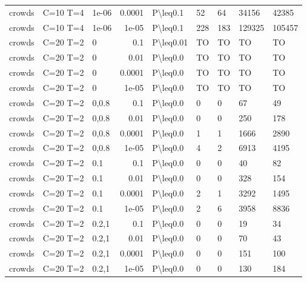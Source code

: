 \begin{longtable}{lllrlllll}
 crowds        & C=10 T=4  & 1e-06 & 0.0001 & P\textbackslash{}leq0.1   & 52   & 64   & 34156    & 42385   \\
 crowds        & C=10 T=4  & 1e-06 & 1e-05  & P\textbackslash{}leq0.1   & 228  & 183  & 129325   & 105457  \\
 crowds        & C=20 T=2  & 0     & 0.1    & P\textbackslash{}leq0.01  & TO   & TO   & TO       & TO      \\
 crowds        & C=20 T=2  & 0     & 0.01   & P\textbackslash{}leq0.0   & TO   & TO   & TO       & TO      \\
 crowds        & C=20 T=2  & 0     & 0.0001 & P\textbackslash{}leq0.0   & TO   & TO   & TO       & TO      \\
 crowds        & C=20 T=2  & 0     & 1e-05  & P\textbackslash{}leq0.0   & TO   & TO   & TO       & TO      \\
 crowds        & C=20 T=2  & 0,0.8 & 0.1    & P\textbackslash{}leq0.0   & 0    & 0    & 67       & 49      \\
 crowds        & C=20 T=2  & 0,0.8 & 0.01   & P\textbackslash{}leq0.0   & 0    & 0    & 250      & 178     \\
 crowds        & C=20 T=2  & 0,0.8 & 0.0001 & P\textbackslash{}leq0.0   & 1    & 1    & 1666     & 2890    \\
 crowds        & C=20 T=2  & 0,0.8 & 1e-05  & P\textbackslash{}leq0.0   & 4    & 2    & 6913     & 4195    \\
 crowds        & C=20 T=2  & 0.1   & 0.1    & P\textbackslash{}leq0.0   & 0    & 0    & 40       & 82      \\
 crowds        & C=20 T=2  & 0.1   & 0.01   & P\textbackslash{}leq0.0   & 0    & 0    & 328      & 154     \\
 crowds        & C=20 T=2  & 0.1   & 0.0001 & P\textbackslash{}leq0.0   & 2    & 1    & 3292     & 1495    \\
 crowds        & C=20 T=2  & 0.1   & 1e-05  & P\textbackslash{}leq0.0   & 2    & 6    & 3958     & 8836    \\
 crowds        & C=20 T=2  & 0.2,1 & 0.1    & P\textbackslash{}leq0.0   & 0    & 0    & 19       & 34      \\
 crowds        & C=20 T=2  & 0.2,1 & 0.01   & P\textbackslash{}leq0.0   & 0    & 0    & 70       & 43      \\
 crowds        & C=20 T=2  & 0.2,1 & 0.0001 & P\textbackslash{}leq0.0   & 0    & 0    & 151      & 100     \\
 crowds        & C=20 T=2  & 0.2,1 & 1e-05  & P\textbackslash{}leq0.0   & 0    & 0    & 130      & 184     \\

\end{longtable}

